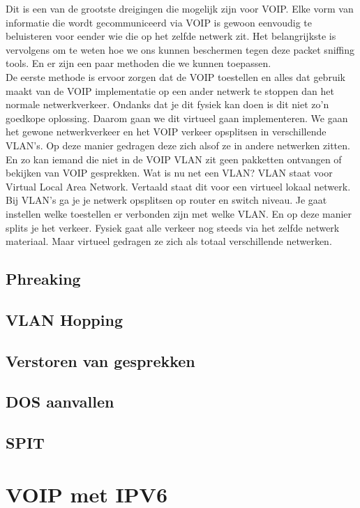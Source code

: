 \documentclass[pdftex,a4paper,12pt,twoside]{report}
\begin{document}
Dit is een van de grootste dreigingen die mogelijk zijn voor VOIP. Elke vorm van informatie die wordt gecommuniceerd via VOIP is gewoon eenvoudig te beluisteren voor eender wie die op het zelfde netwerk zit. Het belangrijkste is vervolgens om te weten hoe we ons kunnen beschermen tegen deze packet sniffing tools. En er zijn een paar methoden die we kunnen toepassen.  \\
De eerste methode is ervoor zorgen dat de VOIP toestellen en alles dat gebruik maakt van de VOIP implementatie op een ander netwerk te stoppen dan het normale netwerkverkeer. Ondanks dat je dit fysiek kan doen is dit niet zo’n goedkope oplossing. Daarom gaan we dit virtueel gaan implementeren. We gaan het gewone netwerkverkeer en het VOIP verkeer opsplitsen in verschillende VLAN’s. Op deze manier gedragen deze zich alsof ze in andere netwerken zitten. En zo kan iemand die niet in de VOIP VLAN zit geen pakketten ontvangen of bekijken van VOIP gesprekken.
Wat is nu net een VLAN? VLAN staat voor Virtual Local Area Network. Vertaald staat dit voor een virtueel lokaal netwerk. Bij VLAN’s ga je je netwerk opsplitsen op router en switch niveau. Je gaat instellen welke toestellen er verbonden zijn met welke VLAN. En op deze manier splits je het verkeer. Fysiek gaat alle verkeer nog steeds via het zelfde netwerk materiaal. Maar virtueel gedragen ze zich als totaal verschillende netwerken. \\






\section{Phreaking}
\section{VLAN Hopping}
\section{Verstoren van gesprekken}
\section{DOS aanvallen}
\section{SPIT}

\chapter{VOIP met IPV6}
\label{ch:VOIP met IPV6}
\end{document}
